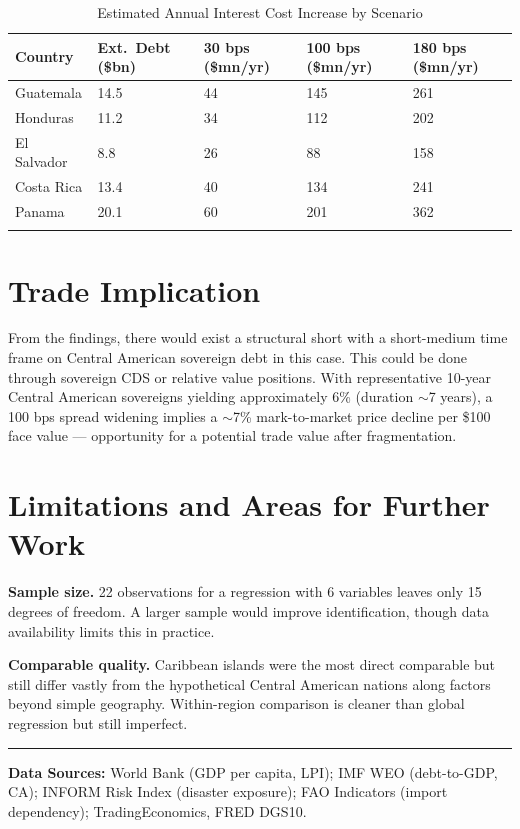 \documentclass[11pt, a4paper]{article}
\begin{document}
\begin{table}[H]
\centering
\caption{Estimated Annual Interest Cost Increase by Scenario}
\label{tab:dollar}
\begin{tabular}{lC{2.2cm}C{2.2cm}C{2.2cm}C{2.2cm}}
\toprule
Country & Ext.\ Debt (\$bn) & 30 bps (\$mn/yr) & 100 bps (\$mn/yr) & 180 bps (\$mn/yr) \\
\midrule
Guatemala     & 14.5 & 44  & 145 & 261   \\
Honduras      & 11.2 & 34  & 112 & 202   \\
El Salvador   &  8.8 & 26  &  88 & 158   \\
Costa Rica    & 13.4 & 40  & 134 & 241   \\
Panama        & 20.1 & 60  & 201 & 362   \\
\midrule
{} &  &  &  &  \\
\end{tabular}
\end{table}

\section{Trade Implication}

From the findings, there would exist a structural short with a short-medium time frame on Central American sovereign debt in this case. This could be done through sovereign CDS or relative value positions. With representative 10-year Central American sovereigns yielding approximately 6\% (duration $\sim$7 years), a 100 bps spread widening implies a $\sim$7\% mark-to-market price decline per \$100 face value --- opportunity for a potential trade value after fragmentation.

\section{Limitations and Areas for Further Work}

\textbf{Sample size.} 22 observations for a regression with 6 variables leaves only 15 degrees of freedom. A larger sample would improve identification, though data availability limits this in practice.

\textbf{Comparable quality.} Caribbean islands were the most direct comparable but still differ vastly from the hypothetical Central American nations along factors beyond simple geography. Within-region comparison is cleaner than global regression but still imperfect.

\vspace{8pt}
\hrule
\vspace{5pt}
{\small \textbf{Data Sources:} World Bank (GDP per capita, LPI); IMF WEO (debt-to-GDP, CA); INFORM Risk Index (disaster exposure); FAO Indicators (import dependency); TradingEconomics, FRED DGS10.}
\end{document}
